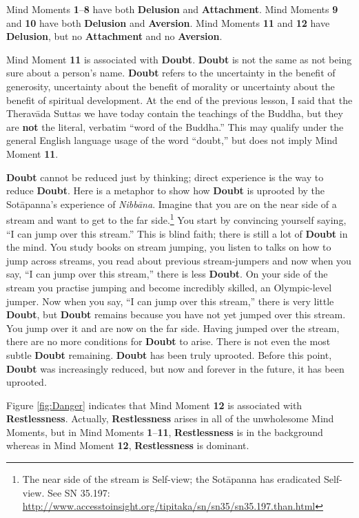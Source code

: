 Mind Moments \textbf{1}--\textbf{8} have both \textbf{Delusion} and \textbf{Attachment}. Mind Moments \textbf{9} and \textbf{10} have both \textbf{Delusion} and \textbf{Aversion}. Mind Moments \textbf{11} and \textbf{12} have \textbf{Delusion}, but no \textbf{Attachment} and no \textbf{Aversion}.

Mind Moment \textbf{11} is associated with \textbf{Doubt}. \textbf{Doubt} is not the same as not being sure about a person’s name. \textbf{Doubt} refers to the uncertainty in the benefit of generosity, uncertainty about the benefit of morality or uncertainty about the benefit of spiritual development. At the end of the previous lesson, I said that the Theravāda Suttas we have today contain the teachings of the Buddha, but they are \textbf{not} the literal, verbatim “word of the Buddha.” This may qualify under the general English language usage of the word “doubt,” but does not imply Mind Moment \textbf{11}.

\textbf{Doubt} cannot be reduced just by thinking; direct experience is the way to reduce \textbf{Doubt}. Here is a metaphor to show how \textbf{Doubt} is uprooted by the Sotāpanna’s experience of \textit{Nibbāna}. Imagine that you are on the near side of a stream and want to get to the far side.\footnote{The near side of the stream is Self-view; the Sotāpanna has eradicated Self-view. See SN 35.197: \url{http://www.accesstoinsight.org/tipitaka/sn/sn35/sn35.197.than.html}} You start by convincing yourself saying, “I can jump over this stream.” This is blind faith; there is still a lot of \textbf{Doubt} in the mind. You study books on stream jumping, you listen to talks on how to jump across streams, you read about previous stream-jumpers and now when you say, “I can jump over this stream,” there is less \textbf{Doubt}. On your side of the stream you practise jumping and become incredibly skilled, an Olympic-level jumper. Now when you say, “I can jump over this stream,” there is very little \textbf{Doubt}, but \textbf{Doubt} remains because you have not yet jumped over this stream. You jump over it and are now on the far side. Having jumped over the stream, there are no more conditions for \textbf{Doubt} to arise. There is not even the most subtle \textbf{Doubt} remaining. \textbf{Doubt} has been truly uprooted. Before this point, \textbf{Doubt} was increasingly reduced, but now and forever in the future, it has been uprooted.

Figure \ref{fig:Danger} indicates that Mind Moment \textbf{12} is associated with \textbf{Restlessness}. Actually, \textbf{Restlessness} arises in all of the unwholesome Mind Moments, but in Mind Moments \textbf{1}--\textbf{11}, \textbf{Restlessness} is in the background whereas in Mind Moment \textbf{12}, \textbf{Restlessness} is dominant.

